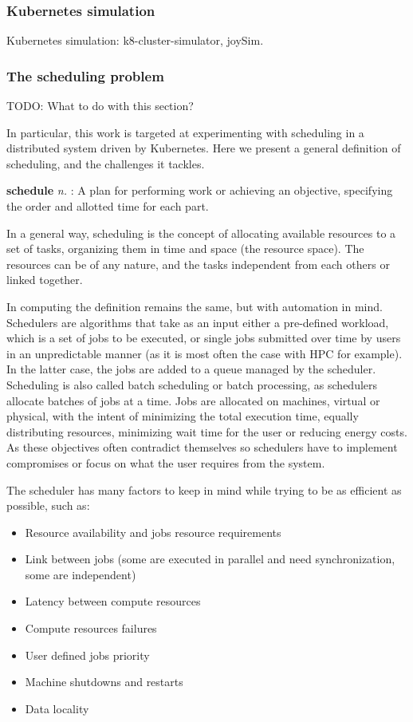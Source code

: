 \documentclass[12pt, a4paper]{memoir}
\begin{document}
\subsubsection{Kubernetes simulation}

Kubernetes simulation: k8-cluster-simulator, joySim.

\subsubsection{The scheduling problem}

TODO: What to do with this section?

In particular, this work is targeted at experimenting with scheduling in a
distributed system driven by Kubernetes. Here we present a general definition
of scheduling, and the challenges it tackles.

\begin{displayquote}[][]
	\textbf{schedule} \textit{n.} : A plan for
	performing work or achieving an objective, specifying the order and
	allotted time for each part.
\end{displayquote}

In a general way, scheduling is the concept of allocating available resources
to a set of tasks, organizing them in time and space (the resource space). The
resources can be of any nature, and the tasks independent from each others or
linked together.

In computing the definition remains the same, but with automation in mind.
Schedulers are algorithms that take as an input either a pre-defined workload,
which is a set of jobs  to be executed, or single jobs submitted over time by
users in an unpredictable manner (as it is most often the case with HPC for
example). In the latter case, the jobs are added to a queue managed by the
scheduler. Scheduling is also called batch scheduling or batch processing, as
schedulers allocate batches of jobs at a time. Jobs are allocated on machines,
virtual or physical, with the intent of minimizing the total execution time,
equally distributing resources, minimizing wait time for the user or reducing
energy costs. As these objectives often contradict themselves so schedulers have
to implement compromises or focus on what the user requires from the system.

The scheduler has many factors to keep in mind while trying to be as efficient
as possible, such as:

\begin{itemize}
	\item Resource availability and jobs resource requirements
	\item Link between jobs (some are executed in parallel and need synchronization, some are independent)
	\item Latency between compute resources
	\item Compute resources failures
	\item User defined jobs priority
	\item Machine shutdowns and restarts
	\item Data locality
\end{itemize}
\end{document}
